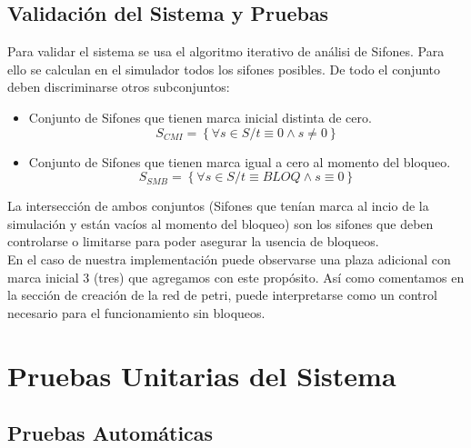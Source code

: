 \documentclass[10pt]{article} %
\begin{document}
\subsection{Validación del Sistema y Pruebas}
Para validar el sistema se usa el algoritmo iterativo de análisi de Sifones.
Para ello se calculan en el simulador todos los sifones posibles. De todo el conjunto deben discriminarse otros subconjuntos:
\begin{itemize}
\item Conjunto de Sifones que tienen marca inicial distinta de cero.
$$S_{CMI}=\left\{\forall s \in S / t\equiv 0 \wedge s\neq 0\right\}$$
\item Conjunto de Sifones que tienen marca igual a cero al momento del bloqueo.
$$S_{SMB}=\left\{\forall s \in S / t\equiv BLOQ \wedge s\equiv 0\right\}$$
\end{itemize}
La intersección de ambos conjuntos (Sifones que tenían marca al incio de la simulación y están vacíos al momento del bloqueo) son los sifones que deben controlarse o limitarse para poder asegurar la usencia de bloqueos.\\
En el caso de nuestra implementación puede observarse una plaza adicional con marca inicial 3 (tres) que agregamos con este propósito. Así como comentamos en la sección de creación de la red de petri, puede interpretarse como un control necesario para el funcionamiento sin bloqueos.
\begin{figure}[H] %
\label{fig:conjuntos}
\end{figure}

\section{Pruebas Unitarias del Sistema}

\subsection{Pruebas Automáticas}
\end{document}
